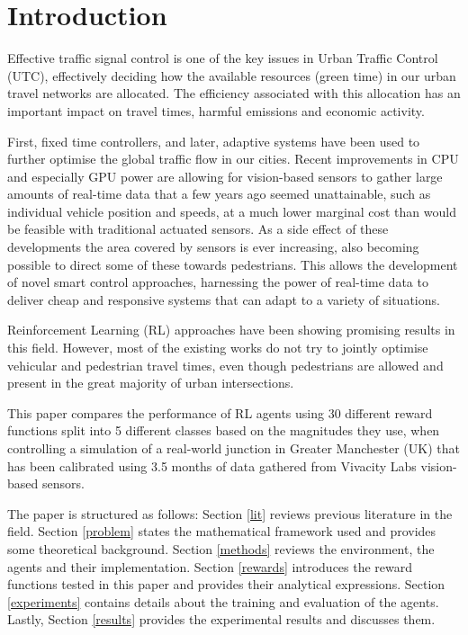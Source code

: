 \documentclass[conference]{IEEEtran}
\begin{document}
\IEEEpeerreviewmaketitle

\section{Introduction}
Effective traffic signal control is one of the key issues in Urban Traffic Control (UTC), effectively deciding how the available resources (green time) in our urban travel networks are allocated.
The efficiency associated with this allocation has an important impact on travel times, harmful emissions and economic activity.

First, fixed time controllers, and later, adaptive systems have been used to further optimise the global traffic flow in our cities.
Recent improvements in CPU and especially GPU power are allowing for vision-based sensors to gather large amounts of real-time data that a few years ago seemed unattainable, such as individual vehicle position and speeds, at a much lower marginal cost than would be feasible with traditional actuated sensors.
As a side effect of these developments the area covered by sensors is ever increasing, also becoming possible to direct some of these towards pedestrians.
This allows the development of novel smart control approaches, harnessing the power of real-time data to deliver cheap and responsive systems that can adapt to a variety of situations.

Reinforcement Learning (RL) approaches have been showing promising results in this field.
However, most of the existing works do not try to jointly optimise vehicular and pedestrian travel times, even though pedestrians are allowed and present in the great majority of urban intersections.

This paper compares the performance of RL agents using 30 different reward functions split into 5 different classes based on the magnitudes they use, when controlling a simulation of a real-world junction in Greater Manchester (UK) that has been calibrated using 3.5 months of data gathered from Vivacity Labs vision-based sensors.

The paper is structured as follows:
Section \ref{lit} reviews previous literature in the field.
Section \ref{problem} states the mathematical framework used and provides some theoretical background.  
Section \ref{methods} reviews the environment, the agents and their implementation.
Section \ref{rewards} introduces the reward functions tested in this paper and provides their analytical expressions.
Section \ref{experiments} contains details about the training and evaluation of the agents.
Lastly, Section \ref{results} provides the experimental results and discusses them.
\end{document}
